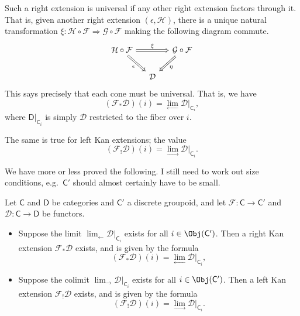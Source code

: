 \documentclass[notes.tex]{subfiles}
\begin{document}
\begin{example}
  Such a right extension is universal if any other right extension factors through it. That is, given another right extension $(\epsilon, \mathcal{H})$, there is a unique natural transformation $\xi\colon \mathcal{H} \circ \mathcal{F} \Rightarrow \mathcal{G} \circ \mathcal{F}$ making the following diagram commute.
  \begin{equation*}
    \begin{tikzcd}[column sep=small]
      \mathcal{H} \circ \mathcal{F}
      \arrow[rr, Rightarrow, "\xi"]
      \arrow[dr, Rightarrow, swap, "\epsilon"]
      && \mathcal{G} \circ \mathcal{F}
      \arrow[dl, Rightarrow, "\eta"]
      \\
      & \mathcal{D}
    \end{tikzcd}
  \end{equation*}
  This says precisely that each cone must be universal. That is, we have
  \begin{equation*}
    (\mathcal{F}_{*}\mathcal{D})(i) = \lim_{\leftarrow} \mathcal{D}|_{\mathsf{C}_{i}},
  \end{equation*}
  where $\mathsf{D}|_{\mathsf{C}_{i}}$ is simply $\mathcal{D}$ restricted to the fiber over $i$.

  The same is true for left Kan extensions; the value
  \begin{equation*}
    (\mathcal{F}_{!}\mathcal{D})(i) = \lim_{\rightarrow} \mathcal{D}|_{\mathsf{C}_{i}}.
  \end{equation*}
\end{example}

We have more or less proved the following. I still need to work out size conditions, e.g.\ $\mathsf{C}'$ should almost certainly have to be small.
\begin{proposition}
  \label{prop:formula_for_kan_extension_through_groupoid}
  Let $\mathsf{C}$ and $\mathsf{D}$ be categories and $\mathsf{C}'$ a discrete groupoid, and let $\mathcal{F}\colon \mathsf{C} \to \mathsf{C}'$ and $\mathcal{D}\colon \mathsf{C} \to \mathsf{D}$ be functors.
  \begin{itemize}
    \item Suppose the limit $\lim_{\leftarrow}\mathcal{D}|_{\mathsf{C}_{i}}$ exists for all $i \in \Obj(\mathsf{C}')$. Then a right Kan extension $\mathcal{F}_{*}\mathcal{D}$ exists, and is given by the formula
      \begin{equation*}
        (\mathcal{F}_{*}\mathcal{D})(i) = \lim_{\leftarrow} \mathcal{D}|_{\mathsf{C}_{i}},
      \end{equation*}

    \item Suppose the colimit $\lim_{\rightarrow}\mathcal{D}|_{\mathsf{C}_{i}}$ exists for all $i \in \Obj(\mathsf{C}')$. Then a left Kan extension $\mathcal{F}_{!}\mathcal{D}$ exists, and is given by the formula
      \begin{equation*}
        (\mathcal{F}_{!}\mathcal{D})(i) = \lim_{\rightarrow} \mathcal{D}|_{\mathsf{C}_{i}}.
      \end{equation*}
  \end{itemize}
\end{proposition}
\end{document}
